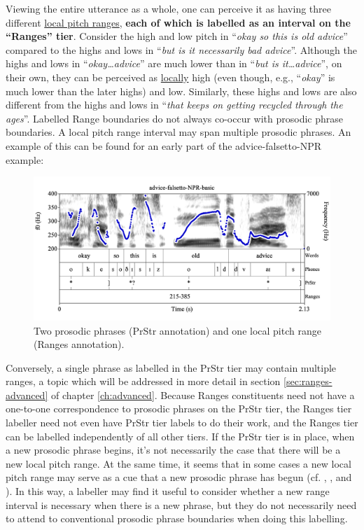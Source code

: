 \documentclass[11pt, twoside]{memoir}
\def\langtext#1{\textit{#1}}
\begin{document}
{{Viewing the entire utterance as a whole, one can perceive it as having three different \uline{local pitch ranges}, \textbf{each of which is labelled as an interval on the “Ranges” tier}. Consider the high and low pitch in “\langtext{okay so this is old advice}” compared to the highs and lows in “\langtext{but is it necessarily bad advice}”. Although the highs and lows in “\langtext{okay\ldots advice}” are much lower than in “\langtext{but is it\ldots advice}”, on their own, they can be perceived as \uline{locally} high (even though, e.g., “\langtext{okay}” is much lower than the later highs) and low. Similarly, these highs and lows are also different from the highs and lows in “\langtext{that keeps on getting recycled through the ages}”.
Labelled Range boundaries do not always co-occur with prosodic phrase boundaries. A local pitch range interval may span multiple prosodic phrases. An example of this can be found for an early part of the advice-falsetto-NPR example:
\begin{figure}[H]
\centering
\includegraphics[width=.875\linewidth]{Ranges-advice-falsetto-basic-first-range.png}
\caption{Two prosodic phrases (PrStr annotation) and one local pitch range (Ranges annotation).
\label{fig:advice-falsetto PrStr Ranges basic}
}
\end{figure}
Conversely, a single phrase as labelled in the PrStr tier may contain multiple ranges, a topic which will be addressed in more detail in section \ref{sec:ranges-advanced} of chapter \ref{ch:advanced}.
Because Ranges constituents need not have a one-to-one correspondence to prosodic phrases on the PrStr tier, the Ranges tier labeller need not even have PrStr tier labels to do their work, and the Ranges tier can be labelled independently of all other tiers. If the PrStr tier is in place, when a new prosodic phrase begins, it’s not necessarily the case that there will be a new local pitch range. At the same time, it seems that in some cases a new local pitch range may serve as a cue that a new prosodic phrase has begun (cf. \citealt{brugos15}, \citealt{brugos-18}, and \citealt{kim20}). In this way, a labeller may find it useful to consider whether a new range interval is necessary when there is a new phrase, but they do not necessarily need to attend to conventional prosodic phrase boundaries when doing this labelling.
}}
\end{document}
